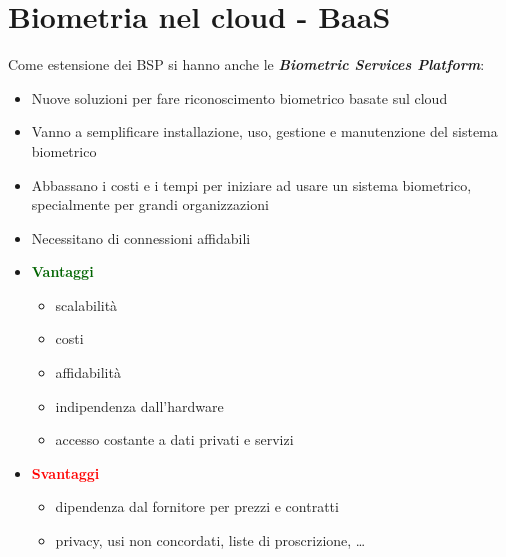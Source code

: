 \documentclass{report}
\begin{document}
\chapter{Biometria nel cloud - BaaS}
Come estensione dei BSP si hanno anche le \textit{\textbf{Biometric Services Platform}}:
\begin{itemize}
    \item Nuove soluzioni per fare riconoscimento biometrico basate sul cloud 
    \item Vanno a semplificare installazione, uso, gestione e manutenzione del sistema biometrico 
    \item Abbassano i costi e i tempi per iniziare ad usare un sistema biometrico, specialmente per grandi organizzazioni
    \item Necessitano di connessioni affidabili
\end{itemize}

\begin{itemize}
    \item \textcolor{darkgreen}{\textbf{Vantaggi}}
    \begin{itemize}
        \item scalabilità
        \item costi 
        \item affidabilità 
        \item indipendenza dall'hardware
        \item accesso costante a dati privati e servizi 
    \end{itemize}
    \item \textcolor{red}{\textbf{Svantaggi}}
    \begin{itemize}
        \item dipendenza dal fornitore per prezzi e contratti 
        \item privacy, usi non concordati, liste di proscrizione, \dots
    \end{itemize}
\end{itemize}
\end{document}
